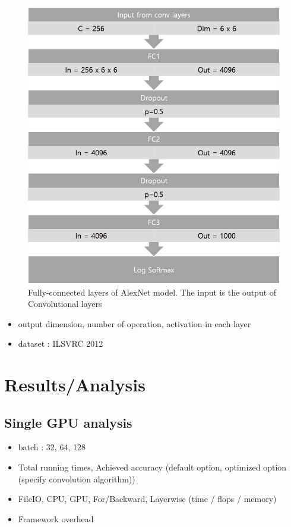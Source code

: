 \documentclass[conference]{IEEEtran}
\begin{document}
\begin{figure}
  \centering
  \includegraphics[width=\linewidth]{./figures/alexnet_fc.jpg}
  \caption{Fully-connected layers of AlexNet model. The input is the output of Convolutional layers}
  \label{fig_alexnet_fc}
\end{figure}

\begin{itemize}
  \item output dimension, number of operation, activation in each layer
  \item dataset : ILSVRC 2012
\end{itemize}

\section{Results/Analysis}

\subsection{Single GPU analysis}

\begin{itemize}
  \item batch : 32, 64, 128
  \item Total running times, Achieved accuracy (default option, optimized option (specify convolution algorithm))
  \item FileIO, CPU, GPU, For/Backward, Layerwise (time / flops / memory)
  \item Framework overhead
\end{itemize}
\end{document}
